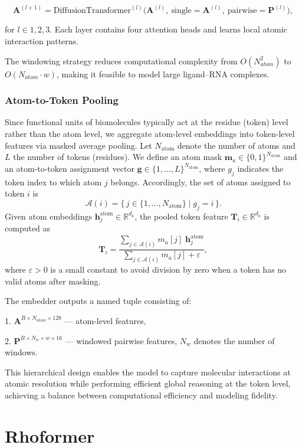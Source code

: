 $$\mathbf{A}^{(l+1)} = \text{DiffusionTransformer}^{(l)}\bigl( \mathbf{A}^{(l)},\ \text{single} = \mathbf{A}^{(l)},\ \text{pairwise} = \mathbf{P}^{(l)} \bigr),$$

for $l \in {1, 2, 3}$. Each layer contains four attention heads and learns local atomic interaction patterns.

The windowing strategy reduces computational complexity from $O(N_{atom}^2)$ to $O(N_{atom} \cdot w)$, making it feasible to model large ligand–RNA complexes.

  
\subsubsection{Atom-to-Token Pooling}

Since functional units of biomolecules typically act at the residue (token) level rather than the atom level, we aggregate atom-level embeddings into token-level features via masked average pooling.
Let $N_{\text{atom}}$ denote the number of atoms and $L$ the number of tokens (residues).
We define an atom mask $\mathbf{m}_a \in \{0,1\}^{N_{\text{atom}}}$ and an atom-to-token assignment vector
$\mathbf{g} \in \{1,\dots,L\}^{N_{\text{atom}}}$, where $g_j$ indicates the token index to which atom $j$ belongs.
Accordingly, the set of atoms assigned to token $i$ is
\[
\mathcal{A}(i) = \{\, j \in \{1,\dots,N_{\text{atom}}\} \mid g_j = i \,\}.
\]
Given atom embeddings $\mathbf{h}^{\text{atom}}_j \in \mathbb{R}^{d_a}$, the pooled token feature $\mathbf{T}_i \in \mathbb{R}^{d_a}$ is computed as
\[
\mathbf{T}_i
= \frac{\sum_{j \in \mathcal{A}(i)} m_a[j]\;\mathbf{h}^{\text{atom}}_j}
       {\sum_{j \in \mathcal{A}(i)} m_a[j] + \varepsilon},
\]
where $\varepsilon>0$ is a small constant to avoid division by zero when a token has no valid atoms after masking.


  

The embedder outputs a named tuple consisting of:

1. $\mathbf{A}^{B \times N_{atom} \times 128}$ — atom-level features,
    
2. $\mathbf{P}^{B \times N_w \times w \times 16}$ — windowed pairwise features, $N_w$ denotes the number of windows.
    

This hierarchical design enables the model to capture molecular interactions at atomic resolution while performing efficient global reasoning at the token level, achieving a balance between computational efficiency and modeling fidelity.

\section{Rhoformer}

